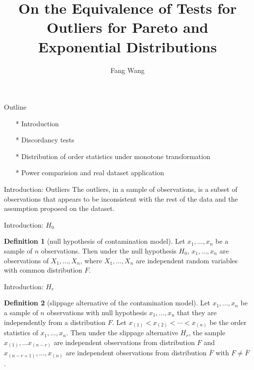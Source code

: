 \documentclass{beamer}
\title{On the Equivalence of Tests for Outliers for Pareto and Exponential Distributions}
\author{Fang Wang}
\institute{McMaster University}
\theoremstyle{definition}
\newtheorem{defn}{Definition}
\theoremstyle{remark}
\begin{document}

\begin{frame}
\titlepage
\end{frame}


\begin{frame}{Outline}
 \begin{enumerate}
	\item[*] Introduction \\
	\item[*] Discordancy tests  \\
	\item[*] Distribution of order statistics under monotone transformation \\
	\item[*] Power comparision and real dataset application
\end{enumerate}

\end{frame}
\begin{frame}{Introduction: Outliers}
    The outliers, in a sample of observations, is a subset of observations that appears to be inconsistent with the rest of the data and the assumption proposed
    on the dataset.
\end{frame}

\begin{frame}{Introduction: $H_0$}
    \begin{defn}[null hypothesis of contamination model] \label{defn: H_0}
        Let $x_1,\ldots,x_n$ be a sample of $n$ observations. Then under the null hypothesis $H_0$, $x_1,\ldots,x_n$ are observations of
        $X_1,\ldots,X_n$, where $X_1,\ldots,X_n$ are independent random variables with common distribution $F$.
    \end{defn}
    
\end{frame}


\begin{frame}{Introduction: $H_r$}
    
    \begin{defn}[slippage alternative of the contamination model] \label{defn: slippage Hr}
        Let $x_1,\ldots,x_n$ be a sample of $n$ observations with null hypothesis $x_1,\ldots,x_n$ that they are independently from a distribution $F$. Let
        $x_{(1)} < x_{(2)} <  \cdots < x_{(n)}$ be the order statistics of $x_1,\ldots,x_n$. Then under the slippage alternative $H_r$,
        the sample $x_{(1)},\ldots x_{(n-r)}$ are independent observations from distribution $F$ and $x_{(n-r+1)},\ldots, x_{(n)}$ are independent observations
        from distribution $\overline F$ with $F \neq \overline F$.
    \end{defn}
\end{frame}
\end{document}
